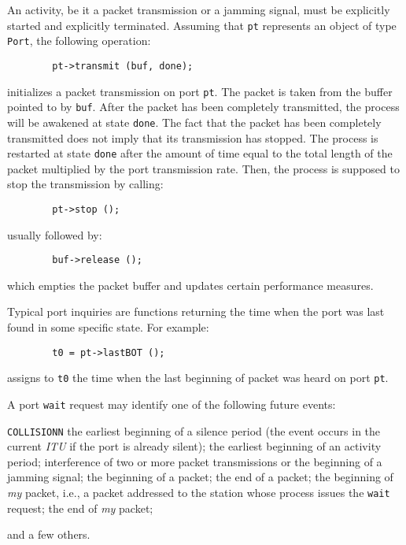 An activity, be it a packet transmission or a jamming signal, must be explicitly
started and explicitly terminated.
Assuming that {\tt pt} represents an object of type {\tt Port}, the following
operation:
{\small
\begin{verbatim}
        pt->transmit (buf, done);
\end{verbatim} }
\noindent
initializes a packet transmission on port {\tt pt}.
The packet is taken from the buffer pointed to by {\tt buf}.
After the packet has been completely transmitted, the process will be
awakened at state {\tt done}.
The fact that the packet has been completely transmitted does not imply that
its transmission has stopped.
The process is restarted at state {\tt done} after the amount of time
equal to the total length of the packet
multiplied by the port transmission rate.
Then, the process is supposed to stop the transmission by calling:
{\small
\begin{verbatim}
        pt->stop ();
\end{verbatim} }
\noindent
usually followed by:
{\small
\begin{verbatim}
        buf->release ();
\end{verbatim} }
\noindent
which empties the packet buffer and updates certain performance measures.

Typical port inquiries are functions returning the time when the port was
last found in some specific state.
For example:
{\small
\begin{verbatim}
        t0 = pt->lastBOT ();
\end{verbatim} }
\noindent
assigns to {\tt t0} the time when the last beginning of packet was heard on
port {\tt pt}.

A port {\tt wait} request may identify one of the following future events:
\begin{llist}{{\tt COLLISIONN}}
the earliest beginning of a silence period (the event occurs in the current
{\em ITU} if the port is already silent);
the earliest beginning of an activity period;
interference of two or more packet transmissions or the beginning of a jamming
signal;
the beginning of a packet;
the end of a packet;
the beginning of {\em my\/} packet, i.e.,
a packet addressed to the station whose process issues the {\tt wait} request;
the end of {\em my\/} packet;
\end{llist}
and a few others.

